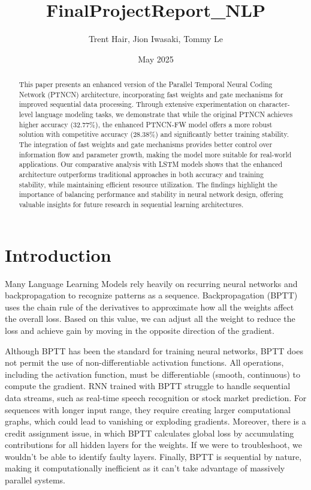 \documentclass{article}
\title{FinalProjectReport\_NLP}
\author{Trent Hair, Jion Iwasaki, Tommy Le}
\date{May 2025}
\begin{document}
\maketitle

\begin{abstract}
This paper presents an enhanced version of the Parallel Temporal Neural Coding Network (PTNCN) architecture, incorporating fast weights and gate mechanisms for improved sequential data processing. Through extensive experimentation on character-level language modeling tasks, we demonstrate that while the original PTNCN achieves higher accuracy (32.77\%), the enhanced PTNCN-FW model offers a more robust solution with competitive accuracy (28.38\%) and significantly better training stability. The integration of fast weights and gate mechanisms provides better control over information flow and parameter growth, making the model more suitable for real-world applications. Our comparative analysis with LSTM models shows that the enhanced architecture outperforms traditional approaches in both accuracy and training stability, while maintaining efficient resource utilization. The findings highlight the importance of balancing performance and stability in neural network design, offering valuable insights for future research in sequential learning architectures.

\end{abstract}

\section{Introduction}
\hspace*{.5cm}Many Language Learning Models rely heavily on recurring neural networks and backpropagation to recognize patterns as a sequence. Backpropagation (BPTT) uses the chain rule of the derivatives to approximate how all the weights affect the overall loss. Based on this value, we can adjust all the weight to reduce the loss and achieve gain by moving in the opposite direction of the gradient. 

Although BPTT has been the standard for training neural networks, BPTT does not permit the use of non-differentiable activation functions. All operations, including the activation function, must be differentiable (smooth, continuous) to compute the gradient. RNN trained with BPTT struggle to handle sequential data streams, such as real-time speech recognition or stock market prediction. For sequences with longer input range, they require creating larger computational graphs, which could lead to vanishing or exploding gradients. Moreover, there is a credit assignment issue, in which BPTT calculates global loss by accumulating contributions for all hidden layers for the weights. If we were to troubleshoot, we wouldn't be able to identify faulty layers. Finally, BPTT is sequential by nature, making it computationally inefficient as it can’t take advantage of massively parallel systems.
\end{document}
